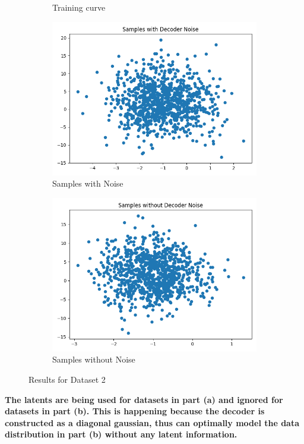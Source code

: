\documentclass{article}
\begin{document}
\begin{enumerate}[(a)]
\begin{figure}[H]
\begin{subfigure}{0.32\textwidth}
        \caption{Training curve}
    \end{subfigure}
    \begin{subfigure}{0.32\textwidth}
        \centering
        \includegraphics[width=\textwidth]{figures/q1_b_dset2_sample_with_noise.png}
        \caption{Samples with Noise}
    \end{subfigure}
    \begin{subfigure}{0.32\textwidth}
        \centering
        \includegraphics[width=\textwidth]{figures/q1_b_dset2_sample_without_noise.png}
        \caption{Samples without Noise}
    \end{subfigure}
    \caption{Results for Dataset 2}
\end{figure}
\textbf{The latents are being used for datasets in part (a) and ignored for datasets in part (b).
This is happening because the decoder is constructed as a diagonal gaussian,
thus can optimally model the data distribution in part (b) without any latent information.}
\end{enumerate}
\end{document}
